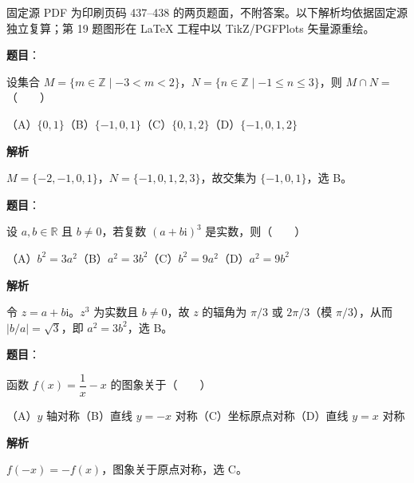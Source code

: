

\begin{gktip}
固定源 PDF 为印刷页码 437–438 的两页题面，不附答案。以下解析均依据固定源独立复算；第 19 题图形在 LaTeX 工程中以 TikZ/PGFPlots 矢量源重绘。
\end{gktip}

\begin{answer}

\textbf{题目}：

设集合 $M=\{m\in\mathbb Z\mid-3<m<2\}$，$N=\{n\in\mathbb Z\mid-1\leqslant n\leqslant3\}$，则 $M\cap N=$\mbox{（　　）}

（A）$\{0,1\}$\quad（B）$\{-1,0,1\}$\quad（C）$\{0,1,2\}$\quad（D）$\{-1,0,1,2\}$

\textbf{解析}

$M=\{-2,-1,0,1\}$，$N=\{-1,0,1,2,3\}$，故交集为 $\{-1,0,1\}$，选 B。


\end{answer}
\begin{answer}

\textbf{题目}：

设 $a,b\in\mathbb R$ 且 $b\ne0$，若复数 $(a+b\mathrm i)^3$ 是实数，则\mbox{（　　）}

（A）$b^2=3a^2$\quad（B）$a^2=3b^2$\quad（C）$b^2=9a^2$\quad（D）$a^2=9b^2$

\textbf{解析}

令 $z=a+b\mathrm i$。$z^3$ 为实数且 $b\ne0$，故 $z$ 的辐角为 $\pi/3$ 或 $2\pi/3$（模 $\pi/3$），从而 $\lvert b/a\rvert=\sqrt3$，即 $a^2=3b^2$，选 B。


\end{answer}
\begin{answer}

\textbf{题目}：

函数 $f(x)=\dfrac1x-x$ 的图象关于\mbox{（　　）}

（A）$y$ 轴对称\quad（B）直线 $y=-x$ 对称\quad（C）坐标原点对称\quad（D）直线 $y=x$ 对称

\textbf{解析}

$f(-x)=-f(x)$，图象关于原点对称，选 C。


\end{answer}
